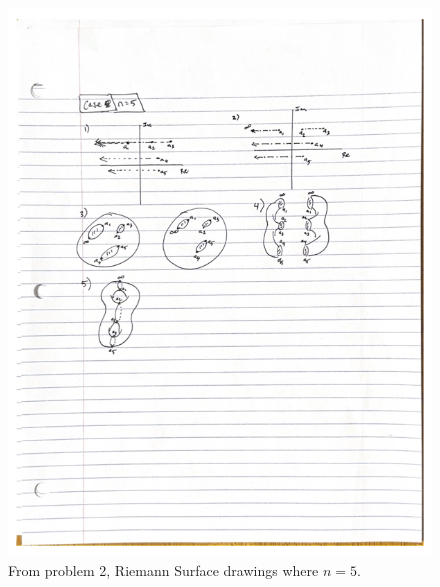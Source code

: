 \documentclass[10pt]{amsart}
\theoremstyle{nonumberplain}
\begin{document}
\begin{enumerate}[label={\bf {\arabic*}:}]
\begin{figure}[h]
	\centering
	\includegraphics[width=1\textwidth]{riemann_surface_5}
 	\caption{
	From problem 2, Riemann Surface drawings where $n=5$.}\label{fig:f3}
\end{figure}


\end{enumerate}
\end{document}
